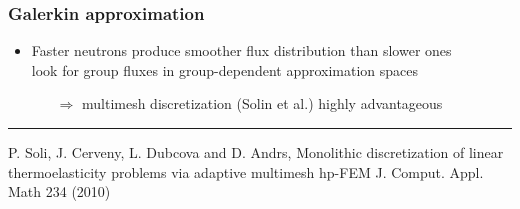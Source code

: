 \begin{frame}[t]
	\frametitle{Galerkin approximation}
	\vspace{4em}
	\begin{itemize}
		\item Faster neutrons produce smoother flux distribution than slower ones\\
					\structure{$\Ra$} look for group fluxes in \alert{group-dependent approximation spaces}
		\begin{itemize}
		    \item[$\Rightarrow$] multimesh discretization (Solin et al.) highly advantageous
		\end{itemize}%
	\end{itemize}
	
	\vspace{.15cm}\color{Black}\hrule width 5.1cm
		\begin{thebibliography}{\textwidth} 
			\beamertemplatearticlebibitems
			\footnotesize{P. Soli, J. Cerveny, L. Dubcova and D. Andrs},
			\newblock \scriptsize{Monolithic discretization of linear thermoelasticity problems via adaptive multimesh hp-FEM}
			\newblock J. Comput. Appl. Math 234 (2010)
		\end{thebibliography}
\end{frame}
